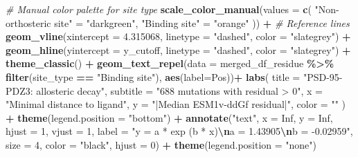 \documentclass[
]{article}
\newenvironment{Shaded}{\begin{snugshade}}{\end{snugshade}}
\newcommand{\AttributeTok}[1]{\textcolor[rgb]{0.13,0.29,0.53}{#1}}
\newcommand{\CommentTok}[1]{\textcolor[rgb]{0.56,0.35,0.01}{\textit{#1}}}
\newcommand{\ConstantTok}[1]{\textcolor[rgb]{0.56,0.35,0.01}{#1}}
\newcommand{\DecValTok}[1]{\textcolor[rgb]{0.00,0.00,0.81}{#1}}
\newcommand{\FloatTok}[1]{\textcolor[rgb]{0.00,0.00,0.81}{#1}}
\newcommand{\FunctionTok}[1]{\textcolor[rgb]{0.13,0.29,0.53}{\textbf{#1}}}
\newcommand{\NormalTok}[1]{#1}
\newcommand{\OtherTok}[1]{\textcolor[rgb]{0.56,0.35,0.01}{#1}}
\newcommand{\SpecialCharTok}[1]{\textcolor[rgb]{0.81,0.36,0.00}{\textbf{#1}}}
\newcommand{\StringTok}[1]{\textcolor[rgb]{0.31,0.60,0.02}{#1}}
\begin{document}
\begin{Shaded}
\begin{Highlighting}[]
  
  \CommentTok{\# Manual color palette for site type}
  \FunctionTok{scale\_color\_manual}\NormalTok{(}\AttributeTok{values =} \FunctionTok{c}\NormalTok{(}
    \StringTok{"Non{-}orthosteric site"} \OtherTok{=} \StringTok{"darkgreen"}\NormalTok{,}
    \StringTok{"Binding site"} \OtherTok{=} \StringTok{"orange"}
\NormalTok{  )) }\SpecialCharTok{+}
  \CommentTok{\# Reference lines}
  \FunctionTok{geom\_vline}\NormalTok{(}\AttributeTok{xintercept =} \FloatTok{4.315068}\NormalTok{, }\AttributeTok{linetype =} \StringTok{"dashed"}\NormalTok{, }\AttributeTok{color =} \StringTok{"slategrey"}\NormalTok{) }\SpecialCharTok{+}
  \FunctionTok{geom\_hline}\NormalTok{(}\AttributeTok{yintercept =}\NormalTok{ y\_cutoff, }\AttributeTok{linetype =} \StringTok{"dashed"}\NormalTok{, }\AttributeTok{color =} \StringTok{"slategrey"}\NormalTok{) }\SpecialCharTok{+}
  \FunctionTok{theme\_classic}\NormalTok{() }\SpecialCharTok{+}
  \FunctionTok{geom\_text\_repel}\NormalTok{(}\AttributeTok{data =}\NormalTok{ merged\_df\_residue }\SpecialCharTok{\%\textgreater{}\%} \FunctionTok{filter}\NormalTok{(site\_type }\SpecialCharTok{==} \StringTok{"Binding site"}\NormalTok{), }\FunctionTok{aes}\NormalTok{(}\AttributeTok{label=}\NormalTok{Pos))}\SpecialCharTok{+}
  \FunctionTok{labs}\NormalTok{(}
    \AttributeTok{title =} \StringTok{"PSD{-}95{-}PDZ3: allosteric decay"}\NormalTok{,}
    \AttributeTok{subtitle =} \StringTok{"688 mutations with residual \textgreater{} 0"}\NormalTok{,}
    \AttributeTok{x =} \StringTok{"Minimal distance to ligand"}\NormalTok{,}
    \AttributeTok{y =} \StringTok{"|Median ESM1v{-}ddGf residual|"}\NormalTok{,}
    \AttributeTok{color =} \StringTok{""}
\NormalTok{  )  }\SpecialCharTok{+} \FunctionTok{theme}\NormalTok{(}\AttributeTok{legend.position =} \StringTok{"bottom"}\NormalTok{) }\SpecialCharTok{+}
    \FunctionTok{annotate}\NormalTok{(}\StringTok{"text"}\NormalTok{,  }\AttributeTok{x =} \ConstantTok{Inf}\NormalTok{, }\AttributeTok{y =} \ConstantTok{Inf}\NormalTok{,}
             \AttributeTok{hjust =} \DecValTok{1}\NormalTok{, }\AttributeTok{vjust =} \DecValTok{1}\NormalTok{,}
           \AttributeTok{label =} \StringTok{"y = a * exp (b * x)}\SpecialCharTok{\textbackslash{}n}\StringTok{a =  1.43905}\SpecialCharTok{\textbackslash{}n}\StringTok{b = {-}0.02959"}\NormalTok{,}
           \AttributeTok{size =} \DecValTok{4}\NormalTok{, }\AttributeTok{color =} \StringTok{"black"}\NormalTok{, }\AttributeTok{hjust =} \DecValTok{0}\NormalTok{) }\SpecialCharTok{+} \FunctionTok{theme}\NormalTok{(}\AttributeTok{legend.position =} \StringTok{"none"}\NormalTok{)}
\end{Highlighting}
\end{Shaded}
\end{document}
